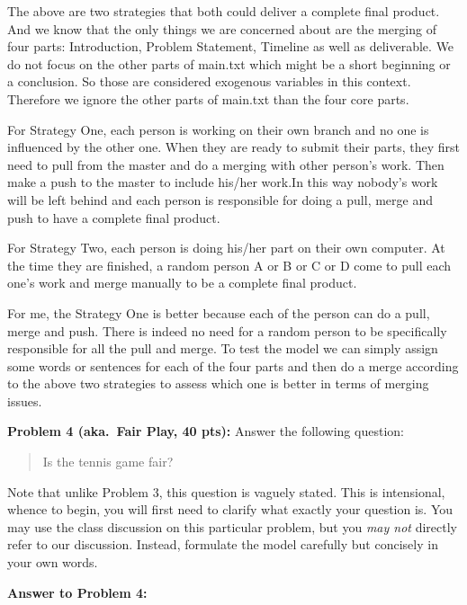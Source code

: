 \documentclass[12pt]{article}
\begin{document}
The above are two strategies that both could deliver a complete final product. And we know that the only things we are concerned about are the merging of four parts: Introduction, Problem Statement, Timeline as well as deliverable. We do not focus on the other parts of main.txt which might be a short beginning or a conclusion. So those are considered exogenous variables in this context. Therefore we ignore the other parts of main.txt than the four core parts.

For Strategy One, each person is working on their own branch and no one is influenced by the other one. When they are ready to submit their parts, they first need to pull from the master and do a merging with other person's work. Then make a push to the master to include his/her work.In this way nobody's work will be left behind and each person is responsible for doing a pull, merge and push to have a complete final product.

For Strategy Two, each person is doing his/her part on their own computer. At the time they are finished, a random person A or B or C or D come to pull each one's work and merge manually to be a complete final product.

For me, the Strategy One is better because each of the person can do a pull, merge and push. There is indeed no need for a random person to be specifically responsible for all the pull and merge. To test the model we can simply assign some words or sentences for each of the four parts and then do a merge according to the above two strategies to assess which one is better in terms of merging issues.





\newpage
\vskip0.25in
\noindent\textbf{Problem 4 (aka.\ Fair Play, 40 pts):}
Answer the following question:
\begin{verse}
Is the tennis game fair?
\end{verse}
Note that unlike Problem 3, this question is vaguely stated.
This is intensional, whence to begin, you will first need to clarify
what exactly your question is.
You may use the class discussion on this particular 
problem, but you \emph{may not} directly refer to our 
discussion.  Instead, formulate the model carefully but concisely in 
your own words.   

\newpage
\noindent\textbf{Answer to Problem 4:}\\
\end{document}
